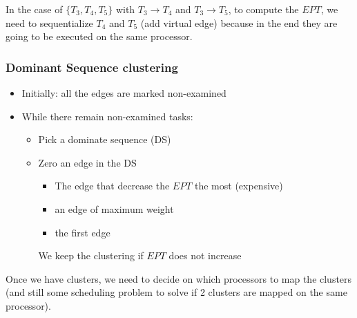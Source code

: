 In the case of $\{T_3,T_4,T_5\}$ with $T_3 \to T_4$ and $T_3 \to T_5$, to compute the $EPT$, we need to sequentialize $T_4$ and $T_5$ (add virtual edge) because in the end they are going to be executed on the same processor.

\subsubsection*{Dominant Sequence clustering} 
\begin{itemize}
\item Initially: all the edges are marked non-examined
\item While there remain non-examined tasks:
\begin{itemize}
\item Pick a dominate sequence (DS)
\item Zero an edge in the DS
\begin{itemize}
\item The edge that decrease the $EPT$ the most (expensive)
\item an edge of maximum weight
\item the first edge
\end{itemize}
We keep the clustering if $EPT$ does not increase
\end{itemize}
\end{itemize}

Once we have clusters, we need to decide on which processors to map the clusters (and still some scheduling problem to solve if 2 clusters are mapped on the same processor).